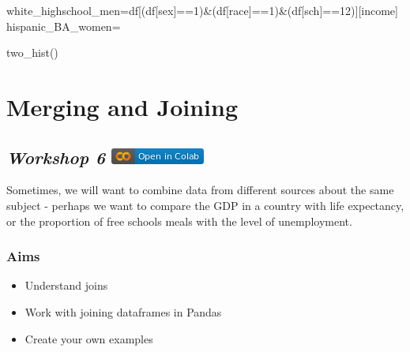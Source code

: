 \documentclass[
  letterpaper,
  DIV=11,
  numbers=noendperiod]{scrreprt}
\newenvironment{Shaded}{\begin{snugshade}}{\end{snugshade}}
\newcommand{\DecValTok}[1]{\textcolor[rgb]{0.68,0.00,0.00}{#1}}
\newcommand{\NormalTok}[1]{\textcolor[rgb]{0.00,0.23,0.31}{#1}}
\newcommand{\OperatorTok}[1]{\textcolor[rgb]{0.37,0.37,0.37}{#1}}
\newcommand{\StringTok}[1]{\textcolor[rgb]{0.13,0.47,0.30}{#1}}
\providecommand{\tightlist}{%
  \setlength{\itemsep}{0pt}\setlength{\parskip}{0pt}}\usepackage{longtable,booktabs,array}
\begin{document}
\begin{Shaded}
\begin{Highlighting}[]
\NormalTok{white\_highschool\_men}\OperatorTok{=}\NormalTok{df[(df[}\StringTok{\textquotesingle{}sex\textquotesingle{}}\NormalTok{]}\OperatorTok{==}\DecValTok{1}\NormalTok{)}\OperatorTok{\&}\NormalTok{(df[}\StringTok{\textquotesingle{}race\textquotesingle{}}\NormalTok{]}\OperatorTok{==}\DecValTok{1}\NormalTok{)}\OperatorTok{\&}\NormalTok{(df[}\StringTok{\textquotesingle{}sch\textquotesingle{}}\NormalTok{]}\OperatorTok{==}\DecValTok{12}\NormalTok{)][}\StringTok{\textquotesingle{}income\textquotesingle{}}\NormalTok{]}
\NormalTok{hispanic\_BA\_women}\OperatorTok{=}

\NormalTok{two\_hist()}
\end{Highlighting}
\end{Shaded}


\hypertarget{merging-and-joining}{%
\chapter{Merging and Joining}\label{merging-and-joining}}

\hypertarget{workshop-6-open-in-colab}{%
\section[\emph{Workshop 6} ]{\texorpdfstring{\emph{Workshop 6}
\href{https://colab.research.google.com/github/oballinger/QM2/blob/main/notebooks/W06.\%20Merging\%20and\%20Joining.ipynb}{\protect\includegraphics{index_files/mediabag/colab-badge.png}}}{Workshop 6 Open In Colab}}\label{workshop-6-open-in-colab}}

Sometimes, we will want to combine data from different sources about the
same subject - perhaps we want to compare the GDP in a country with life
expectancy, or the proportion of free schools meals with the level of
unemployment.

\hypertarget{aims-3}{%
\subsection{Aims}\label{aims-3}}

\begin{itemize}
\tightlist
\item
  Understand joins
\item
  Work with joining dataframes in Pandas
\item
  Create your own examples
\end{itemize}
\end{document}
